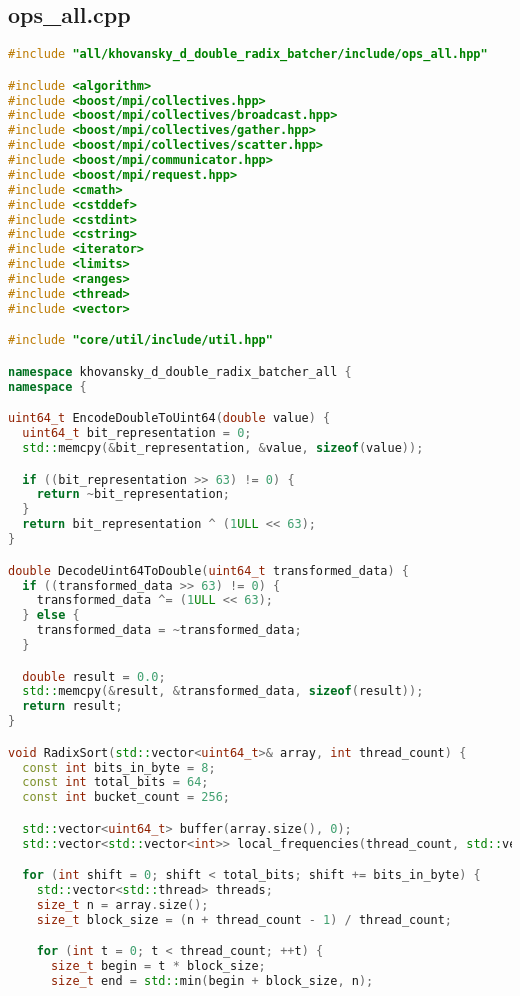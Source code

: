 \documentclass[12pt]{article}
\begin{document}
\subsection*{ops\_all.cpp}
\begin{lstlisting}[language=C++,
    breaklines=true,       % Автоматический перенос строк
    columns=fullflexible ]
#include "all/khovansky_d_double_radix_batcher/include/ops_all.hpp"

#include <algorithm>
#include <boost/mpi/collectives.hpp>
#include <boost/mpi/collectives/broadcast.hpp>
#include <boost/mpi/collectives/gather.hpp>
#include <boost/mpi/collectives/scatter.hpp>
#include <boost/mpi/communicator.hpp>
#include <boost/mpi/request.hpp>
#include <cmath>
#include <cstddef>
#include <cstdint>
#include <cstring>
#include <iterator>
#include <limits>
#include <ranges>
#include <thread>
#include <vector>

#include "core/util/include/util.hpp"

namespace khovansky_d_double_radix_batcher_all {
namespace {

uint64_t EncodeDoubleToUint64(double value) {
  uint64_t bit_representation = 0;
  std::memcpy(&bit_representation, &value, sizeof(value));

  if ((bit_representation >> 63) != 0) {
    return ~bit_representation;
  }
  return bit_representation ^ (1ULL << 63);
}

double DecodeUint64ToDouble(uint64_t transformed_data) {
  if ((transformed_data >> 63) != 0) {
    transformed_data ^= (1ULL << 63);
  } else {
    transformed_data = ~transformed_data;
  }

  double result = 0.0;
  std::memcpy(&result, &transformed_data, sizeof(result));
  return result;
}

void RadixSort(std::vector<uint64_t>& array, int thread_count) {
  const int bits_in_byte = 8;
  const int total_bits = 64;
  const int bucket_count = 256;

  std::vector<uint64_t> buffer(array.size(), 0);
  std::vector<std::vector<int>> local_frequencies(thread_count, std::vector<int>(bucket_count, 0));

  for (int shift = 0; shift < total_bits; shift += bits_in_byte) {
    std::vector<std::thread> threads;
    size_t n = array.size();
    size_t block_size = (n + thread_count - 1) / thread_count;

    for (int t = 0; t < thread_count; ++t) {
      size_t begin = t * block_size;
      size_t end = std::min(begin + block_size, n);


\end{lstlisting}
\end{document}
